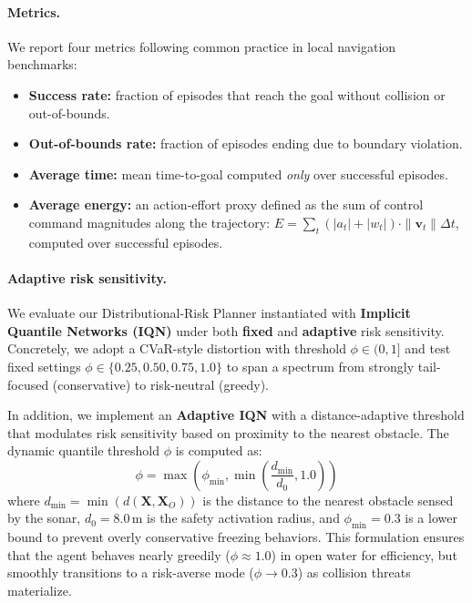 \paragraph{Metrics.}
We report four metrics following common practice in local navigation benchmarks:
\begin{itemize}
    \item \textbf{Success rate:} fraction of episodes that reach the goal without collision or out-of-bounds.
    \item \textbf{Out-of-bounds rate:} fraction of episodes ending due to boundary violation.
    \item \textbf{Average time:} mean time-to-goal computed \emph{only} over successful episodes.
    \item \textbf{Average energy:} an action-effort proxy defined as the sum of control command magnitudes along the trajectory: $E = \sum_{t} (|a_t| + |w_t|) \cdot \|\mathbf{v}_t\| \Delta t$, computed over successful episodes.
\end{itemize}

\paragraph{Adaptive risk sensitivity.}
We evaluate our Distributional-Risk Planner instantiated with \textbf{Implicit Quantile Networks (IQN)} under both \textbf{fixed} and \textbf{adaptive} risk sensitivity.
Concretely, we adopt a CVaR-style distortion with threshold $\phi \in (0,1]$ and test fixed settings $\phi \in \{0.25,0.50,0.75,1.0\}$ to span a spectrum from strongly tail-focused (conservative) to risk-neutral (greedy).

In addition, we implement an \textbf{Adaptive IQN} with a distance-adaptive threshold that modulates risk sensitivity based on proximity to the nearest obstacle. The dynamic quantile threshold $\phi$ is computed as:
\begin{equation}
\phi = \max\left( \phi_{\min}, \min\left( \frac{d_{\min}}{d_0}, 1.0 \right) \right)
\label{eq:adaptive_phi}
\end{equation}
where $d_{\min} = \min(d(\mathbf{X}, \mathbf{X}_O))$ is the distance to the nearest obstacle sensed by the sonar, $d_0=8.0$\,m is the safety activation radius, and $\phi_{\min}=0.3$ is a lower bound to prevent overly conservative freezing behaviors. This formulation ensures that the agent behaves nearly greedily ($\phi \approx 1.0$) in open water for efficiency, but smoothly transitions to a risk-averse mode ($\phi \to 0.3$) as collision threats materialize.

